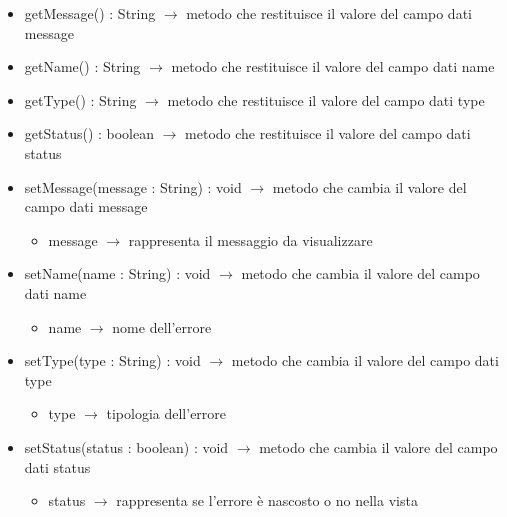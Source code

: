 \begin{description}
\begin{itemize}
	\item getMessage() : String $\rightarrow$ metodo che restituisce il valore del campo dati message
	\item getName() : String $\rightarrow$ metodo che restituisce il valore del campo dati name
	\item getType() : String $\rightarrow$ metodo che restituisce il valore del campo dati type
	\item getStatus() : boolean $\rightarrow$ metodo che restituisce il valore del campo dati status
	\item setMessage(message : String) : void $\rightarrow$ metodo che cambia il valore del campo dati message\begin{itemize}
		\item message $\rightarrow$ rappresenta il messaggio da visualizzare
	\end{itemize}
	
	\item setName(name : String) : void $\rightarrow$ metodo che cambia il valore del campo dati name\begin{itemize}
		\item name $\rightarrow$ nome dell'errore
	\end{itemize}
	
	\item setType(type : String) : void $\rightarrow$ metodo che cambia il valore del campo dati type\begin{itemize}
		\item type $\rightarrow$ tipologia dell'errore
	\end{itemize}
	
	\item setStatus(status : boolean) : void $\rightarrow$ metodo che cambia il valore del campo dati status\begin{itemize}
		\item status $\rightarrow$ rappresenta se l'errore è nascosto o no nella vista
	\end{itemize}
	
\end{itemize}

\end{description}

\vspace{0.5cm}
